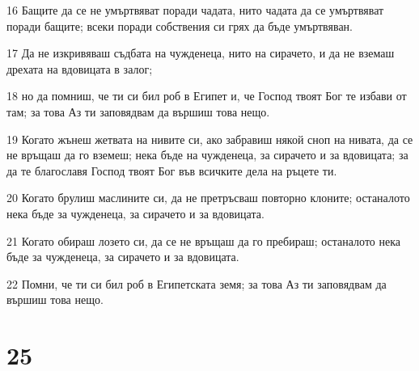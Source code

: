 \par 16 Бащите да се не умъртвяват поради чадата, нито чадата да се умъртвяват поради бащите; всеки поради собствения си грях да бъде умъртвяван.
\par 17 Да не изкривяваш съдбата на чужденеца, нито на сирачето, и да не вземаш дрехата на вдовицата в залог;
\par 18 но да помниш, че ти си бил роб в Египет и, че Господ твоят Бог те избави от там; за това Аз ти заповядвам да вършиш това нещо.
\par 19 Когато жънеш жетвата на нивите си, ако забравиш някой сноп на нивата, да се не връщаш да го вземеш; нека бъде на чужденеца, за сирачето и за вдовицата; за да те благославя Господ твоят Бог във всичките дела на ръцете ти.
\par 20 Когато брулиш маслините си, да не претръсваш повторно клоните; останалото нека бъде за чужденеца, за сирачето и за вдовицата.
\par 21 Когато обираш лозето си, да се не връщаш да го пребираш; останалото нека бъде за чужденеца, за сирачето и за вдовицата.
\par 22 Помни, че ти си бил роб в Египетската земя; за това Аз ти заповядвам да вършиш това нещо.

\chapter{25}

